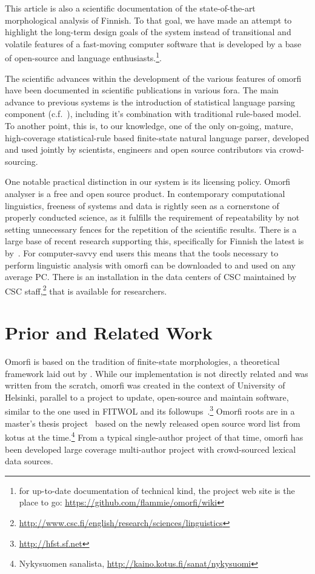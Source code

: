 \documentclass[a4paper,12pt]{article}
\begin{document}
This article is also a scientific documentation of the state-of-the-art
morphological analysis of Finnish. To that goal, we have made an attempt to
highlight the long-term design goals of the system instead of transitional
and volatile features of a fast-moving computer software that is developed
by a base of open-source and language enthusiasts.\footnote{for up-to-date
documentation of technical kind, the project web site is the place to go:
\url{https://github.com/flammie/omorfi/wiki}}.

The scientific advances within the development of
the various features of omorfi have been documented
in scientific publications in various fora. The main
advance to previous systems is the introduction of
statistical language parsing component
(c.f.~\citet[for basic
introduction]{manning1999foundations}), including
it's combination with traditional rule-based model.
To another point, this is, to our knowledge, one of
the only on-going, mature, high-coverage
statistical-rule based finite-state natural language
parser, developed and used jointly by scientists,
engineers and open source contributors via
crowd-sourcing.


One notable practical distinction in our system is its licensing policy. Omorfi
analyser is a free and open source product.  In contemporary computational
linguistics, freeness of systems and data is rightly seen as a cornerstone of
properly conducted science, as it fulfills the requirement of repeatability by
not setting unnecessary fences for the repetition of the scientific results.
There is a large base of recent research supporting this, specifically for
Finnish the latest is by~\citet{koskenniemi2008build}. For computer-savvy end
users this means that the tools necessary to perform linguistic analysis with
omorfi can be downloaded to and used on any average PC. There is an
installation in the data centers of CSC maintained by CSC
staff,\footnote{\url{http://www.csc.fi/english/research/sciences/linguistics}}
that is available for researchers.

\section{Prior and Related Work}
\label{sec:prior-work}

Omorfi is based on the tradition of finite-state
morphologies, a theoretical framework laid out by
\citet{koskenniemi1983twolevel}. While our
implementation is not directly related and was
written from the scratch, omorfi was created in the
context of University of Helsinki, parallel to a
project to update, open-source and maintain
software, similar to the one used in FITWOL and its
followups~\citep{hfst2012}.\footnote{\url{http://hfst.sf.net}}
Omorfi roots are in a master's thesis
project~\citep{pirinen2008suomen} based on the newly
released open source word list from kotus at the
time.\footnote{Nykysuomen sanalista,
\url{http://kaino.kotus.fi/sanat/nykysuomi}} From a
typical single-author project of that time, omorfi
has  been developed large coverage multi-author
project with crowd-sourced lexical data sources.
\end{document}
